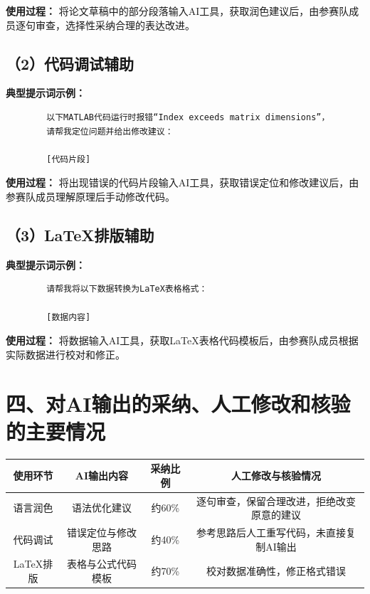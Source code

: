 \documentclass[a4paper,12pt]{article}
\begin{document}
	\textbf{使用过程：} 将论文草稿中的部分段落输入AI工具，获取润色建议后，由参赛队成员逐句审查，选择性采纳合理的表达改进。
	
	\subsection*{（2）代码调试辅助}
	
	\textbf{典型提示词示例：}
	
	\begin{verbatim}
		以下MATLAB代码运行时报错“Index exceeds matrix dimensions”，
		请帮我定位问题并给出修改建议：
		
		[代码片段]
	\end{verbatim}
	
	\textbf{使用过程：} 将出现错误的代码片段输入AI工具，获取错误定位和修改建议后，由参赛队成员理解原理后手动修改代码。
	
	\subsection*{（3）LaTeX排版辅助}
	
	\textbf{典型提示词示例：}
	
	\begin{verbatim}
		请帮我将以下数据转换为LaTeX表格格式：
		
		[数据内容]
	\end{verbatim}
	
	\textbf{使用过程：} 将数据输入AI工具，获取LaTeX表格代码模板后，由参赛队成员根据实际数据进行校对和修正。
	
	\section*{四、对AI输出的采纳、人工修改和核验的主要情况}
	
	\begin{table}[H]
		\centering
		\begin{tabular}{c|c|c|c}
			\hline
			\textbf{使用环节} & \textbf{AI输出内容} & \textbf{采纳比例} & \textbf{人工修改与核验情况} \\
			\hline
			语言润色 & 语法优化建议 & 约60\% & 逐句审查，保留合理改进，拒绝改变原意的建议 \\
			代码调试 & 错误定位与修改思路 & 约40\% & 参考思路后人工重写代码，未直接复制AI输出 \\
			LaTeX排版 & 表格与公式代码模板 & 约70\% & 校对数据准确性，修正格式错误 \\
			\hline
		\end{tabular}
	\end{table}
	
\end{document}
